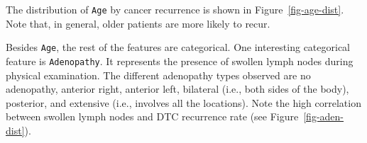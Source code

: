 \documentclass[
  letterpaper,
  DIV=11,
  numbers=noendperiod]{scrartcl}
\begin{document}
%
%
%
%
%

The distribution of \texttt{Age} by cancer recurrence is shown in
Figure~\ref{fig-age-dist}. Note that, in general, older patients are
more likely to recur.




%
%
%

Besides \texttt{Age}, the rest of the features are categorical. One
interesting categorical feature is \texttt{Adenopathy}. It represents
the presence of swollen lymph nodes during physical examination. The
different adenopathy types observed are no adenopathy, anterior right,
anterior left, bilateral (i.e., both sides of the body), posterior, and
extensive (i.e., involves all the locations). Note the high correlation
between swollen lymph nodes and DTC recurrence rate (see
Figure~\ref{fig-aden-dist}).

%
%
%
%
%
\end{document}
